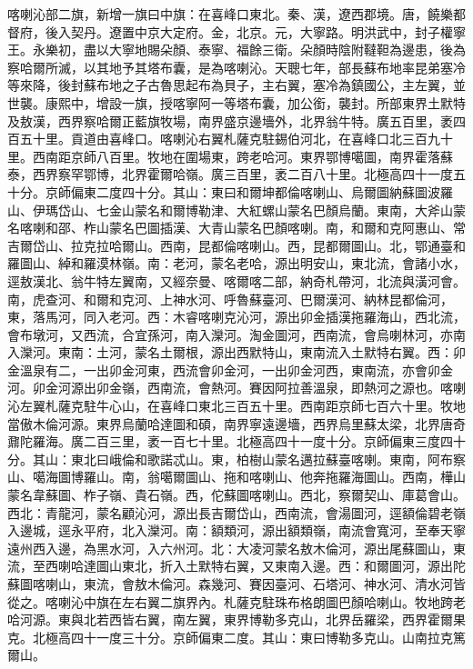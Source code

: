 \begin{pinyinscope}
喀喇沁部二旗，新增一旗曰中旗：在喜峰口東北。秦、漢，遼西郡境。唐，饒樂都督府，後入契丹。遼置中京大定府。金，北京。元，大寧路。明洪武中，封子權寧王。永樂初，盡以大寧地賜朵顏、泰寧、福餘三衛。朵顏時陰附韃靼為邊患，後為察哈爾所滅，以其地予其塔布囊，是為喀喇沁。天聰七年，部長蘇布地率昆弟塞冷等來降，後封蘇布地之子古魯思起布為貝子，主右翼，塞冷為鎮國公，主左翼，並世襲。康熙中，增設一旗，授喀寧阿一等塔布囊，加公銜，襲封。所部東界土默特及敖漢，西界察哈爾正藍旗牧場，南界盛京邊墻外，北界翁牛特。廣五百里，袤四百五十里。貢道由喜峰口。喀喇沁右翼札薩克駐錫伯河北，在喜峰口北三百九十里。西南距京師八百里。牧地在圍場東，跨老哈河。東界鄂博噶圖，南界霍落蘇泰，西界察罕鄂博，北界霍爾哈嶺。廣三百里，袤二百八十里。北極高四十一度五十分。京師偏東二度四十分。其山：東曰和爾坤都倫喀喇山、烏爾圖納蘇圖波羅山、伊瑪岱山、七金山蒙名和爾博勒津、大紅螺山蒙名巴顏烏蘭。東南，大斧山蒙名喀喇和邵、柞山蒙名巴圖插漢、大青山蒙名巴顏喀喇。南，和爾和克阿惠山、常吉爾岱山、拉克拉哈爾山。西南，昆都倫喀喇山。西，昆都爾圖山。北，鄂通臺和羅圖山、綽和羅漠林嶺。南：老河，蒙名老哈，源出明安山，東北流，會諸小水，逕敖漢北、翁牛特左翼南，又經奈曼、喀爾喀二部，納奇札帶河，北流與潢河會。南，虎查河、和爾和克河、上神水河、呼魯蘇臺河、巴爾漢河、納林昆都倫河，東，落馬河，同入老河。西：木睿喀喇克沁河，源出卯金插漢拖羅海山，西北流，會布墩河，又西流，合宜孫河，南入灤河。淘金圖河，西南流，會烏喇林河，亦南入灤河。東南：土河，蒙名土爾根，源出西默特山，東南流入土默特右翼。西：卯金溫泉有二，一出卯金河東，西流會卯金河，一出卯金河西，東南流，亦會卯金河。卯金河源出卯金嶺，西南流，會熱河。賽因阿拉善溫泉，即熱河之源也。喀喇沁左翼札薩克駐牛心山，在喜峰口東北三百五十里。西南距京師七百六十里。牧地當傲木倫河源。東界烏蘭哈達圖和碩，南界寧遠邊墻，西界烏里蘇太梁，北界唐奇鼐陀羅海。廣二百三里，袤一百七十里。北極高四十一度十分。京師偏東三度四十分。其山：東北曰峨倫和歌諾忒山。東，柏樹山蒙名邁拉蘇臺喀喇。東南，阿布察山、噶海圖博羅山。南，翁噶爾圖山、拖和喀喇山、他奔拖羅海圖山。西南，樺山蒙名韋蘇圖、柞子嶺、貴石嶺。西，佗蘇圖喀喇山。西北，察爾契山、庫葛會山。西北：青龍河，蒙名顧沁河，源出長吉爾岱山，西南流，會湯圖河，逕額倫碧老嶺入邊城，逕永平府，北入灤河。南：額類河，源出額類嶺，南流會寬河，至奉天寧遠州西入邊，為黑水河，入六州河。北：大凌河蒙名敖木倫河，源出尾蘇圖山，東流，至西喇哈達圖山東北，折入土默特右翼，又東南入邊。西：和爾圖河，源出陀蘇圖喀喇山，東流，會敖木倫河。森幾河、賽因臺河、石塔河、神水河、清水河皆從之。喀喇沁中旗在左右翼二旗界內。札薩克駐珠布格朗圖巴顏哈喇山。牧地跨老哈河源。東與北若西皆右翼，南左翼，東界博勒多克山，北界岳羅梁，西界霍爾果克。北極高四十一度三十分。京師偏東二度。其山：東曰博勒多克山。山南拉克篤爾山。


\end{pinyinscope}

